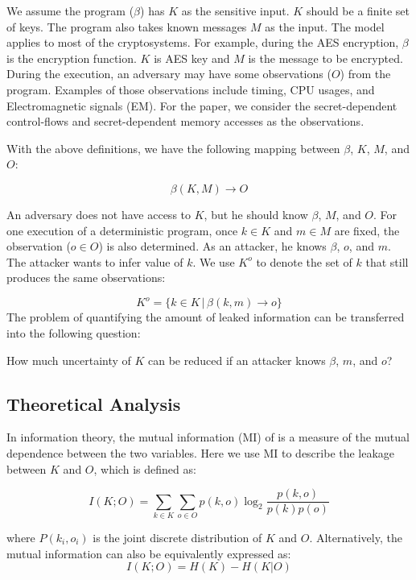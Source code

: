 We assume the program ($\beta$) has $K$ as the sensitive input. 
$K$ should be a finite set of keys. The program also takes known messages $M$ as the input. 
The model applies to most of the cryptosystems. For example,
during the AES encryption, $\beta$ is the encryption function. $K$ is AES key and
$M$ is the message to be encrypted. During the execution, an adversary may have some observations ($O$) from the program. Examples of those observations
include timing, CPU usages, and Electromagnetic signals (EM). For the paper, we
consider the secret-dependent control-flows and secret-dependent memory accesses
as the observations.

With the above definitions, we have the following mapping between $\beta$, $K$, $M$, and $O$:

\begin{displaymath}
    \beta(K, M) \rightarrow	O
\end{displaymath}

An adversary does not have access to $K$, but he should know $\beta$, $M$, and $O$. 
For one execution of a deterministic program, once $k \in K$ and $m \in M$ are fixed, the 
observation ($o \in O$) is also determined. As an attacker, he knows $\beta$, $o$, 
and $m$. The attacker wants to infer value of $k$. We use $K^o$ to denote the set of
$k$ that still produces the same observations:

\begin{displaymath}
    K^o = \{ k \in K \, |\, \beta(k, m) \rightarrow o\}
\end{displaymath}
The problem of quantifying the amount of leaked information can be transferred into the
following question: 

How much uncertainty of $K$ can be reduced if an attacker knows $\beta$, $m$, and $o$?  
 
\subsection{Theoretical Analysis}
In information theory, the mutual information (MI) of is a measure of the mutual dependence 
between the two variables. Here we use MI to describe the leakage between $K$ and $O$, 
which is defined as:

\begin{equation} \label{eq:1}
    I(K;O) = \sum_{k {\in} K}{\sum_{o {\in} O}{p(k, o)\log_2\frac{p(k, o)}{p(k)p(o)}}}
\end{equation}

where $P(k_i, o_i)$ is the joint discrete distribution of $K$ and $O$.
Alternatively, the mutual information can also be equivalently expressed as:
\begin{equation} \label{eq:2}
    I(K;O) = H(K) - H(K|O)
\end{equation}

